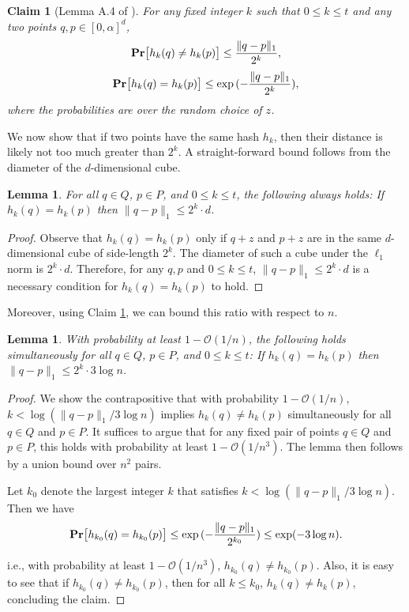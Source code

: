 \documentclass[11pt]{article}
\theoremstyle{plain}
\newtheorem{lem}[theorem]{Lemma}
\newtheorem{clm}[theorem]{Claim}
\newcommand{\OO}{\mathcal{O}}
\newcommand{\pr}[1]{\text{\bf Pr}\normalfont\bigl[ #1 \bigr]}
\begin{document}
\begin{clm}[Lemma A.4 of \cite{BIJ24}]\label{Claim:cite}
    For any fixed integer $k$ such that $0 \leq k \leq t$ and any two points $q, p \in [0, \alpha]^d$,
\[
\pr{h_k(q) \neq h_k(p)} \leq \frac{\lVert q- p \rVert_1}{2^k},
\]\[
\pr{h_k(q) = h_k(p)} \leq \exp{(-\frac{\lVert q- p \rVert_1}{2^k})},
\]
where the probabilities are over the random choice of $z$.
\end{clm}


We now show that if two points have the same hash $h_k$, then their distance is likely not too much greater than $2^k$. A straight-forward bound follows from the diameter of the $d$-dimensional cube.

\begin{lem}\label{Lemma:cube}
    For all $q \in Q$, $p \in P$, and $0 \leq k \leq t$, the following always holds: If $h_k(q) = h_k(p)$ then $\lVert  q- p \rVert_1  \leq 2^k\cdot d$.
\end{lem}

\begin{proof}
    Observe that $h_k(q) = h_k(p)$ only if $q+z$ and $p+z$ are in the same $d$-dimensional cube of side-length $2^k$. The diameter of such a cube under the $\ell_1$ norm is $2^k\cdot d$. Therefore, for any $q, p$ and $0 \leq k \leq t$, $\lVert q - p \rVert_1 \leq 2^k \cdot d$ is a necessary condition for $h_k(q) = h_k(p)$ to hold.
\end{proof}

Moreover, using Claim \ref{Claim:cite}, we can bound this ratio with respect to $n$.

\begin{lem}\label{Lemma:logn}
With probability at least $1-\OO(1/n)$, the following holds simultaneously for all $q \in Q$, $p \in P$, and $0 \leq k \leq t$: If $h_k(q) = h_k(p)$ then $\lVert  q- p \rVert_1  \leq 2^k\cdot 3\log n$.
\end{lem}

\begin{proof}
    We show the contrapositive that with probability $1-\OO(1/n)$, $k < \log(\lVert q- p \rVert_1 / 3\log n)$ implies $h_k(q) \neq h_k(p)$ simultaneously for all $q \in Q$ and $p \in P$. It suffices to argue that for any fixed pair of points $q \in Q$ and $p \in P$, this holds with probability at least $1-\OO(1/n^3)$. The lemma then follows by a union bound over $n^2$ pairs.

    Let $k_0$ denote the largest integer $k$ that satisfies $k < \log(\lVert q- p \rVert_1 / 3\log n)$. Then we have
    \[
    \pr{h_{k_0}(q) = h_{k_0}(p)} \leq \exp{(-\frac{\lVert q- p \rVert_1}{2^{k_0}})} \leq \exp(-3\log n).
    \]
    
    i.e., with probability at least $1-\OO(1/n^3)$, $h_{k_0}(q) \neq h_{k_0}(p)$. Also, it is easy to see that if $h_{k_0}(q) \neq h_{k_0}(p)$, then for all $k \leq k_0$, $h_{k}(q) \neq h_{k}(p)$, concluding the claim.
    
\end{proof}
\end{document}
